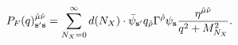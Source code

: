 \begin{equation}
 P_F(q)_{{\bf s}'{\bf s}}^{{\hat \mu} {\hat \nu}}
 =  \sum_{N_X=0}^\infty d(N_X) \cdot
     {\bar \psi}_{{\bf s}'}
      q_{\hat \rho} \Gamma^{\hat \rho} \psi_{\bf s}
     {{\eta^{{\hat \mu} {\hat \nu}}} \over {q^2 + M_{N_X}^2}}.
\label{propagator0-p}
\end{equation}


